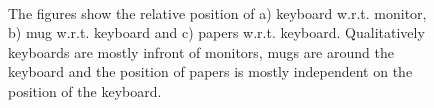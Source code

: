 \documentclass[letterpaper, 10 pt, conference]{ieeeconf}  %
\begin{document}
\begin{figure}
\begin{center}
\quad
{}\\
\end{center}
\label{fig:scatter-rest}
\caption{The figures show the relative position of a) keyboard w.r.t. monitor, b) mug w.r.t. keyboard and c) papers w.r.t. keyboard. Qualitatively keyboards are mostly infront of monitors, mugs are around the keyboard and the position of papers is mostly independent on the position of the keyboard.} 
\end{figure}
\end{document}
